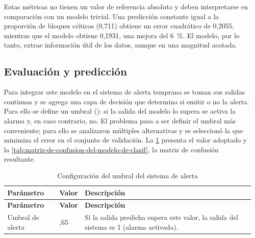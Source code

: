 Estas métricas no tienen un valor de referencia absoluto y deben interpretarse en comparación con un modelo trivial. Una predicción constante igual a la proporción de bloques críticos (0,711) obtiene un error cuadrático de 0,2055, mientras que el modelo obtiene 0,1931, una mejora del \qty{6}{\percent}. El modelo, por lo tanto, extrae información útil de los datos, aunque en una magnitud acotada.

\subsection{Evaluación y predicción}\label{evaluaciuxf3n-y-predicciuxf3n}

Para integrar este modelo en el sistema de alerta temprana se toman sus salidas continuas y se agrega una capa de decisión que determina si emitir o no la alerta. Para ello se define un umbral (): si la salida del modelo lo supera se activa la alarma y, en caso contrario, no. El problema pasa a ser definir el umbral más conveniente; para ello se analizaron múltiples alternativas y se seleccionó la que minimiza el error en el conjunto de validación. La \cref{tab:configuracion-del-umbral-del-sistema-de-} presenta el valor adoptado y la \cref{tab:matriz-de-confusion-del-modelo-de-clasif}, la matriz de confusión resultante.

\begin{longtable}[]{@{}
>{\raggedright\arraybackslash}p{}
  >{\centering\arraybackslash}p{}
  >{\raggedright\arraybackslash}p{}@{}}
\caption{Configuración del umbral del sistema de alerta}
\label{tab:configuracion-del-umbral-del-sistema-de-}\\
\toprule\noalign{}
\textbf{Parámetro} & \textbf{Valor} & \textbf{Descripción} \\
\midrule\noalign{}
\endfirsthead
\toprule\noalign{}
\textbf{Parámetro} & \textbf{Valor} & \textbf{Descripción} \\
\midrule\noalign{}
\endhead
\bottomrule\noalign{}
\endlastfoot
Umbral de alerta & 0,65 & Si la salida predicha supera este valor, la salida del sistema es 1 (alarma activada). \\
\end{longtable}


